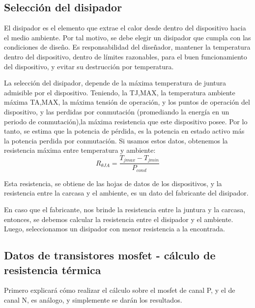 \subsection{Selección del disipador} 

El disipador es el elemento que extrae el calor desde dentro del dispositivo hacia el medio ambiente. Por tal motivo, se debe elegir un disipador que cumpla con las condiciones de diseño. Es responsabilidad del diseñador, mantener la temperatura dentro del dispositivo, dentro de límites razonables, para el buen funcionamiento del dispositivo, y evitar su destrucción por temperatura. 

La selección del disipador, depende de la máxima temperatura de juntura admisible por el dispositivo. Teniendo, la TJ,MAX, la temperatura ambiente máxima TA,MAX, la máxima tensión de operación, y los puntos de operación del dispositivo, y las perdidas por conmutación (promediando la energía en un periodo de conmutación),la máxima resistencia que este dispositivo posee. Por lo tanto, se estima que la potencia de pérdida, es la potencia en estado activo más la potencia perdida por conmutación. Si usamos estos datos, obtenemos la resistencia máxima entre temperatura y ambiente: 
\begin{equation*}
	R_{\theta JA} = \frac{T_{jmax}- T_{jmin}}{P_{cond}}
\end{equation*}

Esta resistencia, se obtiene de las hojas de datos de los dispositivos, y la resistencia entre la carcasa y el ambiente, es un dato del fabricante del disipador. 

En caso que el fabricante, nos brinde la resistencia entre la juntura y la carcasa, entonces, se debemos calcular la resistencia entre el disipador y el ambiente. Luego, seleccionamos un disipador con menor resistencia a la encontrada. 

\subsection{Datos de transistores mosfet - cálculo de resistencia térmica }

Primero explicará cómo realizar el cálculo sobre el mosfet de canal P, y el de canal N, es análogo, y simplemente se darán los resultados. 

